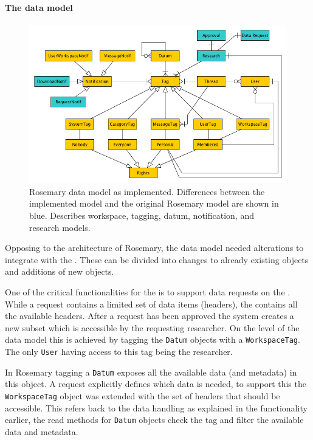 \paragraph{The data model}
\begin{figure}[!b]
	\centering
	\includegraphics[width=0.8\linewidth]{images/datamodel-adapted}
	\caption{
		Rosemary data model as implemented. 
		Differences between the implemented \ivfsystem{} model and the original Rosemary model are shown in blue.
		Describes workspace, tagging, datum, notification, and research models.
	}
	\label{fig:implementation-rosemary-dm}
\end{figure}

Opposing to the architecture of Rosemary, the data model needed alterations to integrate with the \ivfsystem{}.
These can be divided into changes to already existing objects and additions of new objects.

One of the critical functionalities for the \ivfsystem{} is to support data requests on the \projectdata{}.
While a request contains a limited set of data items (headers), the \projectdata{} contains all the available headers.
After a request has been approved the system creates a new subset which is accessible by the requesting researcher.
On the level of the data model this is achieved by tagging the {\tt Datum} objects with a {\tt WorkspaceTag}.
The only {\tt User} having access to this tag being the researcher.

In Rosemary tagging a {\tt Datum} exposes all the available data (and metadata) in this object.
A request explicitly defines which data is needed, to support this the {\tt WorkspaceTag} object was extended with the set of headers that should be accessible.
This refers back to the data handling as explained in the functionality earlier, the read methods for {\tt Datum} objects check the tag and filter the available data and metadata.


